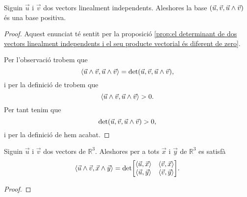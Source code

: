 \documentclass[../../Main.tex]{subfiles}
\begin{document}
	\begin{proposition}
		\label{prop:dos vectors linealment independents i el seu producte vectorial formen una base positiva}
		Siguin \(\vec{u}\) i \(\vec{v}\) dos vectors linealment independents. Aleshores la base \((\vec{u},\vec{v},\vec{u}\mathbin{\wedge}\vec{v})\) és una base positiva.
		\begin{proof}
			Aquest enunciat té sentit per la proposició \ref{prop:el determinant de dos vectors linealment independents i el seu producte vectorial és diferent de zero}.
			
			Per l'observació  trobem que
			\[\prodesc{\vec{u}\prodvec\vec{v}}{\vec{u}\prodvec\vec{v}}=\det(\vec{u},\vec{v},\vec{u}\prodvec\vec{v}),\]
			i per la definició de  trobem que
			\[\prodesc{\vec{u}\prodvec\vec{v}}{\vec{u}\prodvec\vec{v}}>0.\]
			Per tant tenim que
			\[\det(\vec{u},\vec{v},\vec{u}\mathbin{\wedge}\vec{v})>0,\]
			i per la definició de  hem acabat.
		\end{proof}
	\end{proposition}
	\begin{proposition}
		\label{prop:fórmula de Lagrange}
		Siguin \(\vec{u}\) i \(\vec{v}\) dos vectors de \(\mathbb{R}^{3}\). Aleshores per a tots \(\vec{x}\) i \(\vec{y}\) de \(\mathbb{R}^{3}\) es satisfà
		\[\prodesc{\vec{u}\prodvec\vec{v}}{\vec{x}\prodvec\vec{y}}=\det\left[\begin{matrix}
			\prodesc{\vec{u}}{\vec{x}} & \prodesc{\vec{v}}{\vec{x}} \\
			\prodesc{\vec{u}}{\vec{y}} & \prodesc{\vec{v}}{\vec{y}}
		\end{matrix}\right].\]
		\begin{proof}
		\end{proof}
	\end{proposition}
\end{document}

